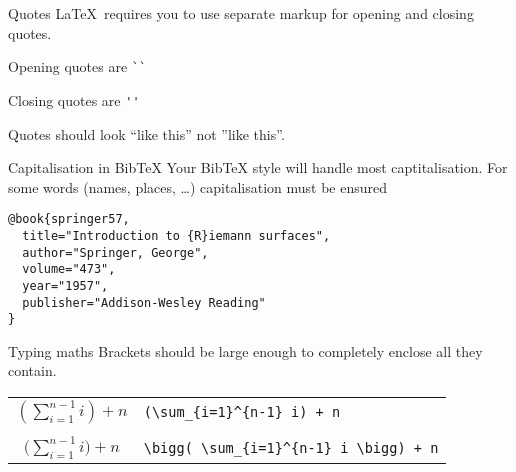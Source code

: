 \begin{frame}[fragile]{Quotes}
  \LaTeX\ requires you to use separate markup for opening and closing quotes. 

  Opening quotes are \lstinline|``|

  Closing quotes are \lstinline|''|

  Quotes should look ``like this'' not ''like this''.
\end{frame}

\begin{frame}[fragile]{Capitalisation in BibTeX}
  Your BibTeX style will handle most captitalisation. For some words (names,
  places, \ldots) capitalisation must be ensured
  \begin{lstlisting}
@book{springer57,
  title="Introduction to {R}iemann surfaces",
  author="Springer, George",
  volume="473",
  year="1957",
  publisher="Addison-Wesley Reading"
}
  \end{lstlisting}
\end{frame}

\begin{frame}[fragile]{Typing maths}
  Brackets should be large enough to completely enclose all they contain.
  \begin{table}
    \centering
    \begin{tabular}{cl}
      $(\sum\limits_{i=1}^{n-1} i) + n$ \hspace{1cm} &
        \lstinline|(\sum_{i=1}^{n-1} i) + n| \\ & \\
      $\bigg(\sum\limits_{i=1}^{n-1} i\bigg) + n$ \hspace{1cm} &
        \lstinline|\bigg( \sum_{i=1}^{n-1} i \bigg) + n| \\
    \end{tabular}
  \end{table}
\end{frame}

